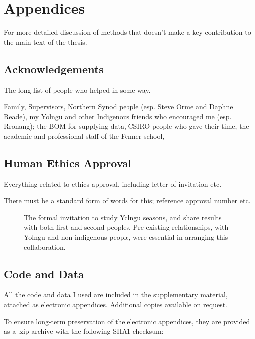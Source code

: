 \chapter{Appendices}
\label{ch:appendices}


For more detailed discussion of methods that doesn't make a key contribution to the main text of the thesis.

\section{Acknowledgements}
The long list of people who helped in some way.

Family, Supervisors, Northern Synod people (esp. Steve Orme and Daphne Reade),
my Yolngu and other Indigenous friends who encouraged me (esp. Rronang);
the BOM for supplying data, CSIRO people who gave their time,
the academic and professional staff of the Fenner school,


\section{Human Ethics Approval} \label{sec:ethics}
Everything related to ethics approval, including letter of invitation etc.

There must be a standard form of words for this; reference approval number etc.

\begin{figure}[p]
    \centering
    \caption[Letter of invitation for collaborative research]{
        The formal invitation to study Yolngu seasons,
        and share results with both first and second peoples.
        Pre-existing relationships, with Yolngu and non-indigenous people,
        were essential in arranging this collaboration.
        }
    \label{app:invitation-letter}
\end{figure}


\section{Code and Data} \label{sec:appendix-code}
All the code and data I used are included in the supplementary material,
attached as electronic appendices.  Additional copies available on request.

To ensure long-term preservation of the electronic appendices, they
are provided as a .zip archive with the following SHA1 checksum:

